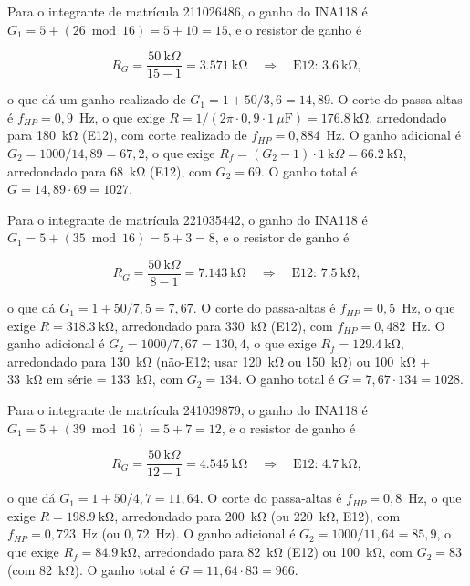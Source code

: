\documentclass[11pt,a4paper]{article}
\begin{document}
Para o integrante de matrícula 211026486, o ganho do INA118 é $G_1 = 5 + (26 \bmod 16) = 5 + 10 = 15$, e o resistor de ganho é

\begin{equation}
R_G = \frac{50~\text{k}\Omega}{15 - 1} = \SI{3,571}{\kilo\ohm} \quad \Rightarrow \quad \text{E12: } \SI{3,6}{\kilo\ohm} ,
\label{eq:rg_211026486}
\end{equation}

o que dá um ganho realizado de $G_1 = 1 + 50/3{,}6 = 14{,}89$. O corte do passa-altas é $f_{HP} = 0{,}9$~Hz, o que exige $R = 1/(2\pi \cdot 0{,}9 \cdot 1~\mu\text{F}) = \SI{176,8}{\kilo\ohm}$, arredondado para \SI{180}{\kilo\ohm} (E12), com corte realizado de $f_{HP} = 0{,}884$~Hz. O ganho adicional é $G_2 = 1000/14{,}89 = 67{,}2$, o que exige $R_f = (G_2 - 1) \cdot 1~\text{k}\Omega = \SI{66,2}{\kilo\ohm}$, arredondado para \SI{68}{\kilo\ohm} (E12), com $G_2 = 69$. O ganho total é $G = 14{,}89 \cdot 69 = 1027$.

Para o integrante de matrícula 221035442, o ganho do INA118 é $G_1 = 5 + (35 \bmod 16) = 5 + 3 = 8$, e o resistor de ganho é

\begin{equation}
R_G = \frac{50~\text{k}\Omega}{8 - 1} = \SI{7,143}{\kilo\ohm} \quad \Rightarrow \quad \text{E12: } \SI{7,5}{\kilo\ohm} ,
\label{eq:rg_221035442}
\end{equation}

o que dá $G_1 = 1 + 50/7{,}5 = 7{,}67$. O corte do passa-altas é $f_{HP} = 0{,}5$~Hz, o que exige $R = \SI{318,3}{\kilo\ohm}$, arredondado para \SI{330}{\kilo\ohm} (E12), com $f_{HP} = 0{,}482$~Hz. O ganho adicional é $G_2 = 1000/7{,}67 = 130{,}4$, o que exige $R_f = \SI{129,4}{\kilo\ohm}$, arredondado para \SI{130}{\kilo\ohm} (não-E12; usar \SI{120}{\kilo\ohm} ou \SI{150}{\kilo\ohm}) ou \SI{100}{\kilo\ohm} + \SI{33}{\kilo\ohm} em série = \SI{133}{\kilo\ohm}, com $G_2 = 134$. O ganho total é $G = 7{,}67 \cdot 134 = 1028$.

Para o integrante de matrícula 241039879, o ganho do INA118 é $G_1 = 5 + (39 \bmod 16) = 5 + 7 = 12$, e o resistor de ganho é

\begin{equation}
R_G = \frac{50~\text{k}\Omega}{12 - 1} = \SI{4,545}{\kilo\ohm} \quad \Rightarrow \quad \text{E12: } \SI{4,7}{\kilo\ohm} ,
\label{eq:rg_241039879}
\end{equation}

o que dá $G_1 = 1 + 50/4{,}7 = 11{,}64$. O corte do passa-altas é $f_{HP} = 0{,}8$~Hz, o que exige $R = \SI{198,9}{\kilo\ohm}$, arredondado para \SI{200}{\kilo\ohm} (ou \SI{220}{\kilo\ohm}, E12), com $f_{HP} = 0{,}723$~Hz (ou $0{,}72$~Hz). O ganho adicional é $G_2 = 1000/11{,}64 = 85{,}9$, o que exige $R_f = \SI{84,9}{\kilo\ohm}$, arredondado para \SI{82}{\kilo\ohm} (E12) ou \SI{100}{\kilo\ohm}, com $G_2 = 83$ (com \SI{82}{\kilo\ohm}). O ganho total é $G = 11{,}64 \cdot 83 = 966$.
\end{document}

